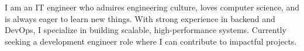 
\begin{cvparagraph}
I am an IT engineer who admires engineering culture, loves computer science, and is always eager to learn new things. With strong experience in backend and DevOps, I specialize in building scalable, high-performance systems. Currently seeking a development engineer role where I can contribute to impactful projects.
\end{cvparagraph}
